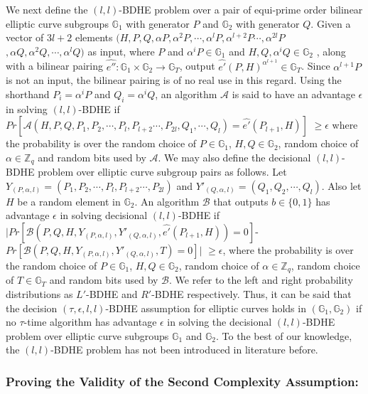 We next define the $(l,l)$-BDHE problem over a pair of equi-prime order bilinear elliptic curve subgroups $\mathbb{G}_1$ with generator $P$ and $\mathbb{G}_2$ with generator $Q$. Given a vector of $3l+2$ elements $(H,P,Q, \alpha P, {\alpha}^2P,\cdots,{\alpha}^{l}P,{\alpha}^{l+2}P\cdots,{\alpha}^{2l}P$ $,\alpha Q, {\alpha}^2Q,\cdots,{\alpha}^{l}Q)$ as input, where $P$ and ${\alpha}^iP \in \mathbb{G}_1$ and $H,Q,\alpha^iQ \in \mathbb{G}_2$ , along with a bilinear pairing $\hat{e''}:\mathbb{G}_1 \times \mathbb{G}_2\longrightarrow\mathbb{G}_T$, output $\hat{e'}(P,H)^{\alpha^{l+1}}\in\mathbb{G}_T$. Since ${\alpha}^{l+1}P$ is not an input, the bilinear pairing is of no real use in this regard. Using the shorthand $P_i = \alpha^{i}P$ and $Q_i=\alpha^{i}Q$, an algorithm $\mathcal{A}$ is said to have an advantage $\epsilon$ in solving $(l,l)$-BDHE if 
$Pr[\mathcal{A}(H,P,Q,P_1, P_2,\cdots,P_l,P_{l+2}\cdots,P_{2l},Q_1,\cdots,Q_l)=\hat{e'}(P_{l+1},H)]$ $\geq \epsilon$
where the probability is over the random choice of $P \in \mathbb{G}_1$, $H,Q \in \mathbb{G}_2$, random choice of $\alpha \in \mathbb{Z}_q$ and random bits used by $\mathcal{A}$. We may also define the decisional $(l,l)$-BDHE problem over elliptic curve subgroup pairs as follows. Let $Y_{(P,\alpha,l)}=(P_1, P_2,\cdots,P_l,P_{l+2}\cdots,P_{2l})$ and $Y'_{(Q,\alpha,l)}=(Q_1, Q_2,\cdots,Q_l)$. Also let $H$ be a random element in $\mathbb{G}_2$. An algorithm $\mathcal{B}$ that outputs $b\in\{0,1\}$ has advantage $\epsilon$ in solving decisional $(l,l)$-BDHE if $|Pr[\mathcal{B}(P,Q,H,Y_{(P,\alpha,l)},Y'_{(Q,\alpha,l)},\hat{e'}(P_{l+1},H))=0]$-$Pr[\mathcal{B}(P,Q,H,Y_{(P,\alpha,l)},Y'_{(Q,\alpha,l)},T)=0]|$ $\geq \epsilon$, where the probability is over the random choice of $P \in \mathbb{G}_1$, $H,Q \in \mathbb{G}_2$, random choice of $\alpha \in \mathbb{Z}_q$, random choice of $T\in \mathbb{G}_T$ and random bits used by $\mathcal{B}$. We refer to the left and right probability distributions as $L'$-BDHE and $R'$-BDHE respectively. Thus, it can be said that the decision $(\tau,\epsilon,l,l)$-BDHE assumption for elliptic curves holds in $(\mathbb{G}_1,\mathbb{G}_2)$ if no $\tau$-time algorithm has advantage $\epsilon$  in solving the decisional $(l,l)$-BDHE problem over elliptic curve subgroups $\mathbb{G}_1$ and $\mathbb{G}_2$. To the best of our knowledge, the $(l,l)$-BDHE problem has not been introduced in literature before.

\subsubsection{Proving the Validity of the Second Complexity Assumption:}
\label{app_sec:hardness}

